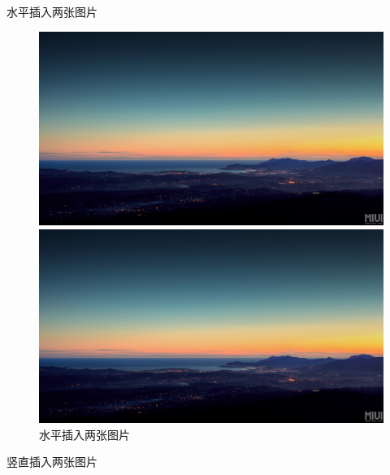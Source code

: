 \documentclass[12pt]{elegantpaper} %
\begin{document}
水平插入两张图片
\begin{figure}		
	\begin{minipage}[c]{0.5\textwidth}		
		\centering		
		\includegraphics[width=1\textwidth]{figure/demo.jpg}		
	\end{minipage}	
	\begin{minipage}[c]{0.5\textwidth}		
		\centering		
		\includegraphics[width=1\textwidth]{figure/demo.jpg}		
	\end{minipage}	
	\caption{水平插入两张图片}	
\end{figure}

竖直插入两张图片
\end{document}
